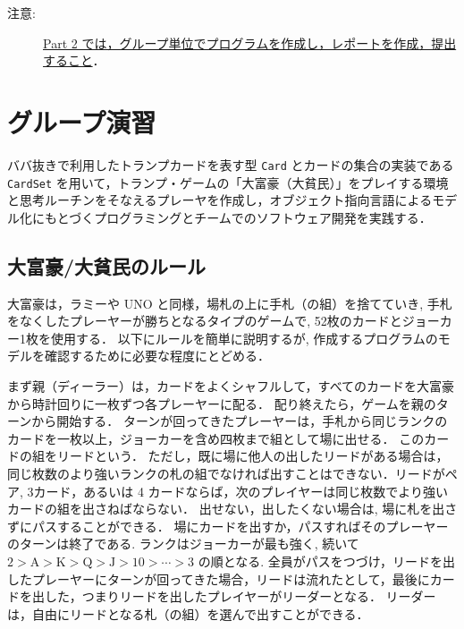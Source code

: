 %
%

\maketitle

\medskip

\begin{description}
\item[注意:] \underline{Part 2 では，グループ単位でプログラムを作成し，レポートを作成，提出すること}．
\end{description}

\medskip

\section{グループ演習}
ババ抜きで利用したトランプカードを表す型 \verb+Card+ とカードの集合の実装である \verb+CardSet+ を用いて，トランプ・ゲームの「大富豪（大貧民）」をプレイする環境と思考ルーチンをそなえるプレーヤを作成し，オブジェクト指向言語によるモデル化にもとづくプログラミングとチームでのソフトウェア開発を実践する．

\subsection*{大富豪/大貧民のルール}
大富豪は，ラミーや UNO と同様，場札の上に手札（の組）を捨てていき, 手札をなくしたプレーヤーが勝ちとなるタイプのゲームで, 52枚のカードとジョーカー1枚を使用する．
以下にルールを簡単に説明するが, 作成するプログラムのモデルを確認するために必要な程度にとどめる．  

まず親（ディーラー）は，カードをよくシャフルして，すべてのカードを大富豪から時計回りに一枚ずつ各プレーヤーに配る．
配り終えたら，ゲームを親のターンから開始する．
ターンが回ってきたプレーヤーは，手札から同じランクのカードを一枚以上，ジョーカーを含め四枚まで組として場に出せる．
このカードの組をリードという．
ただし，既に場に他人の出したリードがある場合は，同じ枚数のより強いランクの札の組でなければ出すことはできない．リードがペア, 3カード，あるいは 4 カードならば，次のプレイヤーは同じ枚数でより強いカードの組を出さねばならない．
出せない，出したくない場合は, 場に札を出さずにパスすることができる．
場にカードを出すか，パスすればそのプレーヤーのターンは終了である. 
ランクはジョーカーが最も強く, 続いて $2 > \mathrm{A} > \mathrm{K} > \mathrm{Q} > \mathrm{J} > 10 > \cdots > 3$ の順となる. 
全員がパスをつづけ，リードを出したプレーヤーにターンが回ってきた場合，リードは流れたとして，最後にカードを出した，つまりリードを出したプレイヤーがリーダーとなる．
リーダーは，自由にリードとなる札（の組）を選んで出すことができる．

